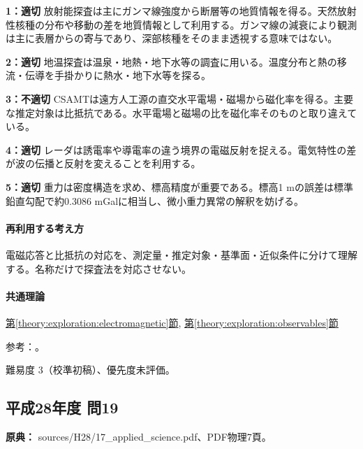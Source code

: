 \noindent\textbf{1：適切} 放射能探査は主にガンマ線強度から断層等の地質情報を得る。天然放射性核種の分布や移動の差を地質情報として利用する。ガンマ線の減衰により観測は主に表層からの寄与であり、深部核種をそのまま透視する意味ではない。\par

\noindent\textbf{2：適切} 地温探査は温泉・地熱・地下水等の調査に用いる。温度分布と熱の移流・伝導を手掛かりに熱水・地下水等を探る。\par

\noindent\textbf{3：不適切} CSAMTは遠方人工源の直交水平電場・磁場から磁化率を得る。主要な推定対象は比抵抗である。水平電場と磁場の比を磁化率そのものと取り違えている。\par

\noindent\textbf{4：適切} レーダは誘電率や導電率の違う境界の電磁反射を捉える。電気特性の差が波の伝播と反射を変えることを利用する。\par

\noindent\textbf{5：適切} 重力は密度構造を求め、標高精度が重要である。標高1 mの誤差は標準鉛直勾配で約0.3086 mGalに相当し、微小重力異常の解釈を妨げる。\par

\paragraph{再利用する考え方} 電磁応答と比抵抗の対応を、測定量・推定対象・基準面・近似条件に分けて理解する。名称だけで探査法を対応させない。

\paragraph{共通理論} \hyperref[theory:exploration:electromagnetic]{第\ref*{theory:exploration:electromagnetic}節}, \hyperref[theory:exploration:observables]{第\ref*{theory:exploration:observables}節}

\par 参考：\cite{ochi_csamt_saijo,gsi_gravity_definitions}。

\par 難易度 3（校準初稿）、優先度未評価。

\subsection{平成28年度 問19}
\label{q:h28-reg-applied-19}

\noindent\textbf{原典：} sources/H28/17\_applied\_science.pdf、PDF物理7頁。

